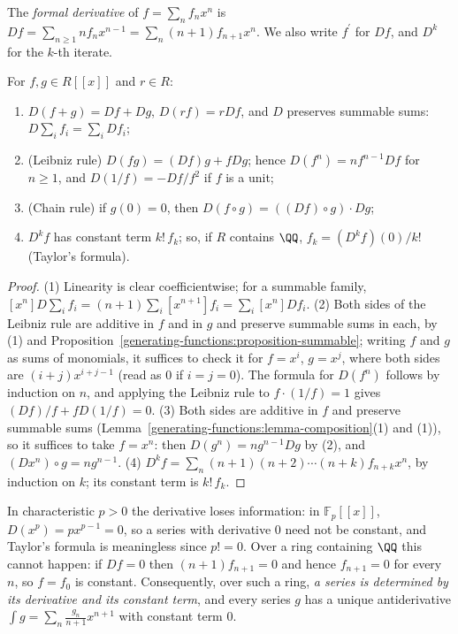 \begin{definition}\label{generating-functions:definition-derivative}
The \emph{formal derivative} of $f = \sum_nf_nx^n$ is $Df = \sum_{n \geq 1}nf_nx^{n-1} = \sum_n(n + 1)f_{n+1}x^n$. We also write $f^{\prime}$ for $Df$, and $D^k$ for the $k$-th iterate.
\end{definition}

\begin{lemma}\label{generating-functions:lemma-derivative}
For $f, g \in R[[x]]$ and $r \in R$:
\begin{enumerate}
\item $D(f + g) = Df + Dg$, $D(rf) = rDf$, and $D$ preserves summable sums: $D\sum_if_i = \sum_iDf_i$;
\item (Leibniz rule) $D(fg) = (Df)g + fDg$; hence $D(f^n) = nf^{n-1}Df$ for $n \geq 1$, and $D(1/f) = -Df/f^2$ if $f$ is a unit;
\item (Chain rule) if $g(0) = 0$, then $D(f \circ g) = ((Df) \circ g) \cdot Dg$;
\item $D^kf$ has constant term $k!\,f_k$; so, if $R$ contains $\QQ$, $f_k = (D^kf)(0)/k!$ (Taylor's formula).
\end{enumerate}
\end{lemma}

\begin{proof}
(1) Linearity is clear coefficientwise; for a summable family, $[x^n]D\sum_if_i = (n + 1)\sum_i[x^{n+1}]f_i = \sum_i[x^n]Df_i$.
(2) Both sides of the Leibniz rule are additive in $f$ and in $g$ and preserve summable sums in each, by (1) and Proposition~\ref{generating-functions:proposition-summable}; writing $f$ and $g$ as sums of
monomials, it suffices to check it for $f = x^i$, $g = x^j$, where both sides are $(i + j)x^{i+j-1}$ (read as $0$ if $i = j = 0$). The formula for $D(f^n)$ follows by induction on $n$, and applying the
Leibniz rule to $f \cdot (1/f) = 1$ gives $(Df)/f + fD(1/f) = 0$.
(3) Both sides are additive in $f$ and preserve summable sums (Lemma~\ref{generating-functions:lemma-composition}(1) and (1)), so it suffices to take $f = x^n$: then $D(g^n) = ng^{n-1}Dg$ by (2),
and $(Dx^n) \circ g = ng^{n-1}$.
(4) $D^kf = \sum_n(n + 1)(n + 2) \cdots (n + k)f_{n+k}x^n$, by induction on $k$; its constant term is $k!\,f_k$.
\end{proof}

\begin{counterexample}\label{generating-functions:counterexample-characteristic}
In characteristic $p > 0$ the derivative loses information: in $\mathbb{F}_p[[x]]$, $D(x^p) = px^{p-1} = 0$, so a series with derivative $0$ need not be constant, and Taylor's formula is
meaningless since $p! = 0$. Over a ring containing $\QQ$ this cannot happen: if $Df = 0$ then $(n + 1)f_{n+1} = 0$ and hence $f_{n+1} = 0$ for every $n$, so $f = f_0$ is constant. Consequently,
over such a ring, \emph{a series is determined by its derivative and its constant term}, and every series $g$ has a unique antiderivative $\int g = \sum_n\frac{g_n}{n + 1}x^{n+1}$ with constant term
$0$.
\end{counterexample}

